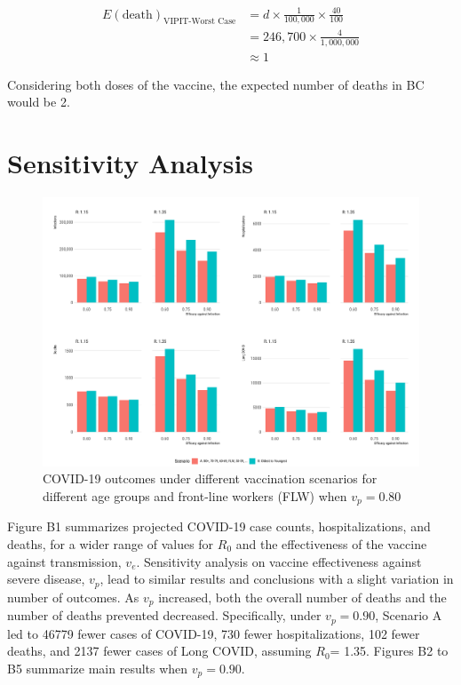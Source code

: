 $$
\begin{aligned}
E(\text{death})_{\text{VIPIT-Worst Case}} & = d \times \frac{1}{100,000} \times \frac{40}{100} \\
& = 246,700 \times \frac{4}{1,000,000} \\
& \approx 1
\end{aligned}
$$

Considering both doses of the vaccine, the expected number of deaths in BC would be 2. 

\section{Sensitivity Analysis}

\begin{figure}[htb]
\begin{center}
\includegraphics[width=6in]{"../figures/fig-barplots.pdf"}
\caption{COVID-19 outcomes under different vaccination scenarios for different age groups and front-line workers (FLW) when $v_p=0.80$}
\end{center}
\end{figure}


Figure B1 summarizes projected COVID-19 case counts, hospitalizations, and deaths, for a wider range of values for $R_0$ and the effectiveness of the vaccine against transmission, $v_e$. Sensitivity analysis on vaccine effectiveness against severe disease, $v_p$, lead to similar results and conclusions with a slight variation in number of outcomes. As $v_p$ increased, both the overall number of deaths and the number of deaths prevented decreased. Specifically, under $v_p=0.90$, Scenario A led to 46779 fewer cases of COVID-19, 730 fewer hospitalizations, 102 fewer deaths, and 2137 fewer cases of Long COVID, assuming $R_0$= 1.35. Figures B2 to B5 summarize main results when $v_p=0.90$.

